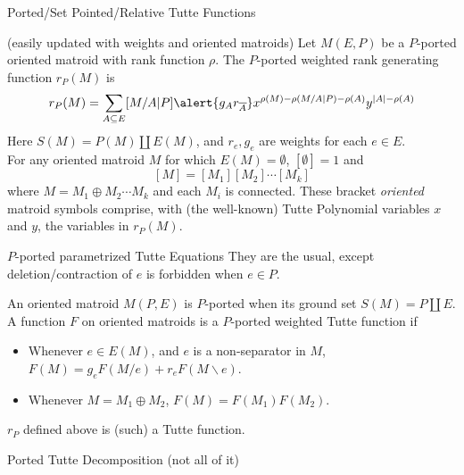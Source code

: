 \documentclass{beamer}
\newcommand{\dunion}{\coprod}
\begin{document}
\begin{frame}{Ported/Set Pointed/Relative Tutte Functions}
  \begin{definition}[sdc 1989]
     (\alert{easily updated with weights and oriented matroids})
    Let $M(E,P)$ be a $P$-ported \alert{oriented} matroid with rank function $\rho$.
    The $P$-ported \alert{weighted} rank generating function $r_P(M)$ is
    \[
    r_P(M) = \sum_{A\subseteq E}[M/A|P]\alert{g_Ar_{\overline{A}}}x^{\rho(M)-\rho(M/A|P)-\rho(A)}y^{|A|-\rho(A)}
    \]
    Here $S(M)=P(M)\dunion E(M)$\alert{, and $r_e,g_e$ are weights for each $e\in E$.}\\
    For any \alert{oriented} matroid $M$ for which $E(M)=\emptyset$, $[\emptyset]=1$ and
    \[
      [M] = [M_1][M_2]\cdots[M_k]
      \]
      where  $M=M_1\oplus M_2 \cdots M_k$ and each $M_i$ is connected.  These bracket
      \emph{oriented} matroid symbols comprise, with (the well-known) Tutte Polynomial
      variables $x$ and $y$, the variables in $r_P(M)$.
  \end{definition}
\end{frame}

\begin{frame}{$P$-ported parametrized Tutte Equations}
  They are the usual, except deletion/contraction of $e$ is
  \alert{forbidden} when $e\in P$.
  \begin{definition}
     An \alert{oriented} matroid $M(P,E)$ is $P$-ported when its
    ground set $S(M)=P\dunion E$.
    A function $F$ on \alert{oriented} matroids is a 
    $P$-ported \alert{weighted} Tutte function if
    \begin{itemize}
    \item Whenever $e\in E(M)$, and $e$ is a non-separator in $M$,
      $F(M) = g_eF(M/e)+r_eF(M\backslash e)$.
    \item Whenever $M=M_1\oplus M_2$, $F(M)=F(M_1)F(M_2)$.
    \end{itemize}
    \begin{theorem} 
     $r_P$ defined above is (such) a Tutte function.
    \end{theorem}
  \end{definition}
\end{frame}



\begin{frame}{Ported Tutte Decomposition (not all of it)}
\hspace{-0.2in}\mbox{}
\end{frame}
\end{document}
